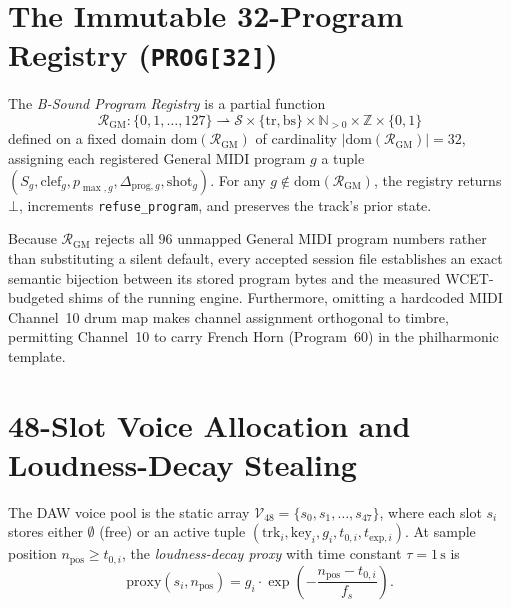 \section{The Immutable 32-Program Registry (\texttt{PROG[32]})}

\begin{definition}
The \emph{B-Sound Program Registry} is a partial function
\begin{equation}
\mathcal{R}_{\mathrm{GM}} : \{0, 1, \dots, 127\} \rightharpoonup \mathcal{S} \times \{\mathrm{tr}, \mathrm{bs}\} \times \mathbb{N}_{>0} \times \mathbb{Z} \times \{0, 1\}
\end{equation}
defined on a fixed domain $\mathrm{dom}(\mathcal{R}_{\mathrm{GM}})$ of cardinality $|\mathrm{dom}(\mathcal{R}_{\mathrm{GM}})| = 32$, assigning each registered General MIDI program $g$ a tuple $(S_g, \mathrm{clef}_g, p_{\max,g}, \Delta_{\mathrm{prog},g}, \mathrm{shot}_g)$. For any $g \notin \mathrm{dom}(\mathcal{R}_{\mathrm{GM}})$, the registry returns $\bot$, increments \texttt{refuse\_program}, and preserves the track's prior state.
\end{definition}

\begin{proposition}
Because $\mathcal{R}_{\mathrm{GM}}$ rejects all $96$ unmapped General MIDI program numbers rather than substituting a silent default, every accepted session file establishes an exact semantic bijection between its stored program bytes and the measured WCET-budgeted shims of the running engine. Furthermore, omitting a hardcoded MIDI Channel~10 drum map makes channel assignment orthogonal to timbre, permitting Channel~10 to carry French Horn (Program~60) in the philharmonic template.
\end{proposition}

\section{48-Slot Voice Allocation and Loudness-Decay Stealing}

\begin{definition}
The DAW voice pool is the static array $\mathcal{V}_{48} = \{s_0, s_1, \dots, s_{47}\}$, where each slot $s_i$ stores either $\emptyset$ (free) or an active tuple $(\mathrm{trk}_i, \mathrm{key}_i, g_i, t_{0,i}, t_{\mathrm{exp},i})$. At sample position $n_{\mathrm{pos}} \ge t_{0,i}$, the \emph{loudness-decay proxy} with time constant $\tau = 1\,\text{s}$ is
\begin{equation}
\label{eq:voice-proxy}
\mathrm{proxy}(s_i, n_{\mathrm{pos}}) = g_i \cdot \exp\!\left(-\frac{n_{\mathrm{pos}} - t_{0,i}}{f_s}\right).
\end{equation}
\end{definition}

